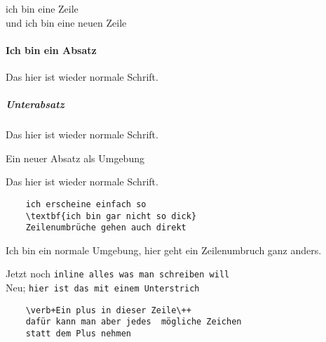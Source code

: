     ich bin eine Zeile\\
    und ich bin eine neuen Zeile
    
    \paragraph{Ich bin ein Absatz \blindtext}
        Das hier ist wieder normale Schrift.
    \subparagraph{Unterabsatz \blindtext}
        Das hier ist wieder normale Schrift.
    
    \begin{paragraph}
        Ein neuer Absatz als Umgebung \blindtext
    \end{paragraph}

    Das hier ist wieder normale Schrift.
    
    \begin{verbatim}
    ich erscheine einfach so
    \textbf{ich bin gar nicht so dick}
    Zeilenumbrüche gehen auch direkt
    \end{verbatim}
    
    Ich bin ein normale Umgebung, hier geht
    ein Zeilenumbruch ganz anders.
    
    Jetzt noch \verb+inline alles was man schreiben will+ \\
    Neu; \verb_hier ist das mit einem Unterstrich_ \\
    
    \begin{verbatim}
    \verb+Ein plus in dieser Zeile\++
    dafür kann man aber jedes  mögliche Zeichen
    statt dem Plus nehmen
    \end{verbatim}

